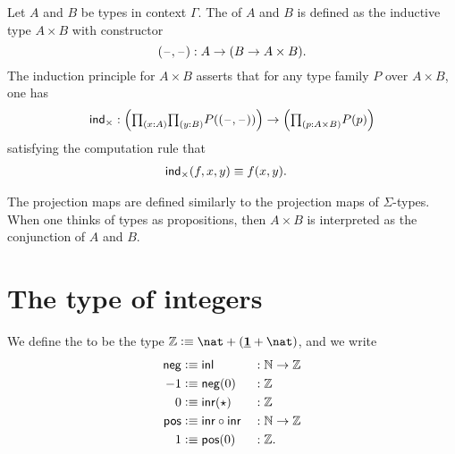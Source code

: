 \begin{defn}
Let $A$ and $B$ be types in context $\Gamma$. The  of $A$ and $B$ is defined as the inductive type $A\times B$ with constructor
\begin{equation*}
{\mathopen{}(\mathord{\hspace{1pt}\text{--}\hspace{1pt}},\mathord{\hspace{1pt}\text{--}\hspace{1pt}})\mathclose{}}:A\to (B\to A\times B).
\end{equation*}
The induction principle for $A\times B$ asserts that for any type family $P$ over $A\times B$, one has
\begin{equation*}
\ind{\times} : \Big(\prd{x:A}{y:B}P(\pairr{\blank,\blank})\Big)\to\Big(\prd{p:A\times B} P(p)\Big)
\end{equation*}
satisfying the computation rule that
\begin{align*}
\mathsf{ind}_{\times}(f,x,y) & \equiv f(x,y).
\end{align*}
\end{defn}

The projection maps are defined similarly to the projection maps of $\Sigma$-types. When one thinks of types as propositions, then $A\times B$ is interpreted as the conjunction of $A$ and $B$.

\section{The type of integers}

\begin{defn}
We define the  to be the type $\Z\defeq\nat+(\unit+\nat)$, and we write
\begin{align*}
\mathsf{neg} & \vcentcolon\equiv {\mathsf{inl}} & &  : \mathbb{N} \to \mathbb{Z} \\
-1 & \vcentcolon\equiv \mathsf{neg}(0) & & : \mathbb{Z} \\
0 & \vcentcolon\equiv {\mathsf{inr}}(\star) & & : \mathbb{Z} \\
\mathsf{pos} & \vcentcolon\equiv {\mathsf{inr}}\circ{\mathsf{inr}} & & : \mathbb{N}\to \mathbb{Z} \\
1 & \vcentcolon\equiv \mathsf{pos}(0) & & : \mathbb{Z}.
\end{align*}
\end{defn}

